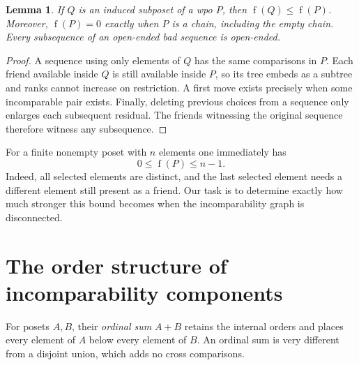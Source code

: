 \documentclass[11pt,letterpaper]{article}
\newtheorem{lemma}[lemma]{Lemma}
\theoremstyle{definition}
\theoremstyle{remark}
\newcommand{\fot}{\operatorname{f}}
\begin{document}
\begin{lemma}\label{lem:elementary}
If $Q$ is an induced subposet of a wpo $P$, then $\fot(Q)\leq\fot(P)$.
Moreover, $\fot(P)=0$ exactly when $P$ is a chain, including the empty chain.
Every subsequence of an open-ended bad sequence is open-ended.
\end{lemma}
\begin{proof}
A sequence using only elements of $Q$ has the same comparisons in $P$.
Each friend available inside $Q$ is still available inside $P$, so its tree
embeds as a subtree and ranks cannot increase on restriction. A first move
exists precisely when some incomparable pair exists. Finally, deleting
previous choices from a sequence only enlarges each subsequent residual.
The friends witnessing the original sequence therefore witness any
subsequence.
\end{proof}

For a finite nonempty poset with $n$ elements one immediately has
\begin{equation}\label{eq:rough-bound}
 0\leq\fot(P)\leq n-1.
\end{equation}
Indeed, all selected elements are distinct, and the last selected element
needs a different element still present as a friend. Our task is to determine
exactly how much stronger this bound becomes when the incomparability graph
is disconnected.

\section{The order structure of incomparability components}
\label{sec:components}
For posets $A,B$, their \emph{ordinal sum} $A+B$ retains the internal orders
and places every element of $A$ below every element of $B$. An ordinal sum
is very different from a disjoint union, which adds no cross comparisons.
\end{document}
